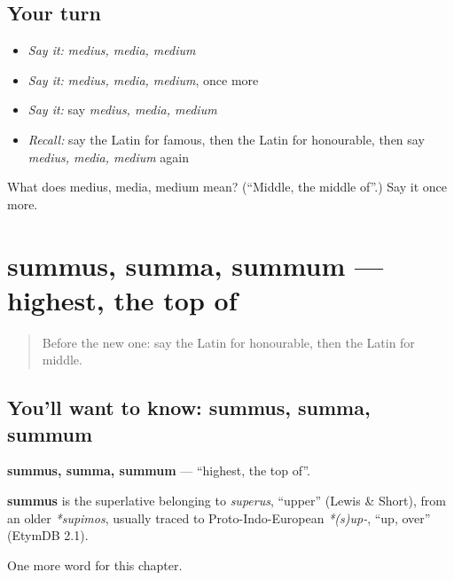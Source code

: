 \subsection*{Your turn}
\begin{itemize}
\raggedright
  \item \emph{Say it:} \emph{medius, media, medium}
  \item \emph{Say it:} \emph{medius, media, medium}, once more
  \item \emph{Say it:} say \emph{medius, media, medium}
  \item \emph{Recall:} say the Latin for famous, then the Latin for honourable, then say \emph{medius, media, medium} again
\end{itemize}

\begin{tcolorbox}[breakable,colback=teal!4,colframe=teal!35!black,title={Before you move on}]
What does medius, media, medium mean? (\textquotedblleft{}Middle, the middle of\textquotedblright{}.) Say it once more.
\end{tcolorbox}
\section[summus, summa, summum]{summus, summa, summum — highest, the top of}

\label{lesson:LA-C183-summus}



\begin{quote}
Before the new one: say the Latin for honourable, then the Latin for middle.
\end{quote}

\subsection*{You'll want to know: summus, summa, summum}
\textbf{summus, summa, summum} — \textquotedblleft{}highest, the top of\textquotedblright{}.

\begin{cousinweb}
\textbf{summus} is the superlative belonging to \emph{superus}, \textquotedblleft{}upper\textquotedblright{} (Lewis \& Short), from an older \emph{*supimos}, usually traced to Proto-Indo-European \emph{*(s)up-}, \textquotedblleft{}up, over\textquotedblright{} (EtymDB 2.1).
\end{cousinweb}

\begin{grammarlens}[title={What you've built}]
One more word for this chapter.
\end{grammarlens}

